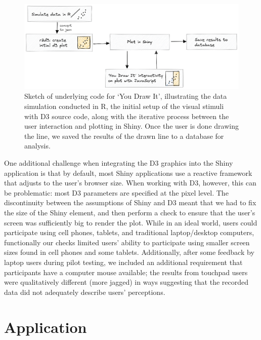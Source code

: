\documentclass[
]{jds}
\providecommand{\DIFaddbeginFL}{} %
\providecommand{\DIFaddendFL}{} %
\providecommand{\DIFdelbeginFL}{} %
\providecommand{\DIFdelendFL}{} %
\newcommand{\DIFscaledelfig}{0.5}
\newlength{\DIFdelgraphicswidth} %
\newlength{\DIFdelgraphicsheight} %
\newcommand{\DIFaddincludegraphics}[2][]{{\color{blue}\fbox{\DIFOincludegraphics[#1]{#2}}}} %
\newcommand{\DIFdelincludegraphics}[2][]{%
\sbox{\DIFdelgraphicsbox}{\DIFOincludegraphics[#1]{#2}}%
\settoboxwidth{\DIFdelgraphicswidth}{\DIFdelgraphicsbox} %
\settoboxtotalheight{\DIFdelgraphicsheight}{\DIFdelgraphicsbox} %
\scalebox{\DIFscaledelfig}{%
\parbox[b]{\DIFdelgraphicswidth}{\usebox{\DIFdelgraphicsbox}\\[-\baselineskip] \rule{\DIFdelgraphicswidth}{0em}}\llap{\resizebox{\DIFdelgraphicswidth}{\DIFdelgraphicsheight}{%
\setlength{\unitlength}{\DIFdelgraphicswidth}%
\begin{picture}(1,1)%
\thicklines\linethickness{2pt} %
{\color[rgb]{1,0,0}\put(0,0){\framebox(1,1){}}}%
{\color[rgb]{1,0,0}\put(0,0){\line( 1,1){1}}}%
{\color[rgb]{1,0,0}\put(0,1){\line(1,-1){1}}}%
\end{picture}%
}\hspace*{3pt}}} %
} %
\DeclareRobustCommand{\DIFaddbeginFL}{\DIFOaddbeginFL \let\includegraphics\DIFaddincludegraphics} %
\DeclareRobustCommand{\DIFaddendFL}{\DIFOaddendFL \let\includegraphics\DIFOincludegraphics} %
\DeclareRobustCommand{\DIFdelbeginFL}{\DIFOdelbeginFL \let\includegraphics\DIFdelincludegraphics} %
\DeclareRobustCommand{\DIFdelendFL}{\DIFOaddendFL \let\includegraphics\DIFOincludegraphics} %
\begin{document}
\begin{figure}

{\centering \DIFdelbeginFL %
\DIFdelendFL \DIFaddbeginFL \includegraphics{images/code-sketch.png}
\DIFaddendFL 

}

\caption{\label{fig-you-draw-it-code-sketch}Sketch of underlying code
for `You Draw It', illustrating the data simulation conducted in R, the
initial setup of the visual stimuli with D3 source code, along with the
iterative process between the user interaction and plotting in Shiny.
Once the user is done drawing the line, we saved the results of the
drawn line to a database for analysis.}

\end{figure}

One additional challenge when integrating the D3 graphics into the Shiny
application is that by default, most Shiny applications use a reactive
framework that adjusts to the user's browser size. When working with D3,
however, this can be problematic: most D3 parameters are specified at
the pixel level. The discontinuity between the assumptions of Shiny and
D3 meant that we had to fix the size of the Shiny element, and then
perform a check to ensure that the user's screen was sufficiently big to
render the plot. While in an ideal world, users could participate using
cell phones, tablets, and traditional laptop/desktop computers,
functionally our checks limited users' ability to participate using
smaller screen sizes found in cell phones and some tablets.
Additionally, after some feedback by laptop users during pilot testing,
we included an additional requirement that participants have a computer
mouse available; the results from touchpad users were qualitatively
different (more jagged) in ways suggesting that the recorded data did
not adequately describe users' perceptions.

\hypertarget{application}{%
\section{Application}\label{application}}
\end{document}
